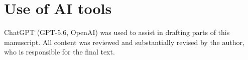 \documentclass[a4paper,12pt]{amsart}
\theoremstyle{plain}
\theoremstyle{definition}
\theoremstyle{remark}
\numberwithin{equation}{subsection}
\begin{document}
\section*{Use of AI tools}

\noindent
ChatGPT (GPT-5.6, OpenAI) was used to
assist in drafting parts of this manuscript. All content was reviewed and substantially
revised by the author, who is responsible for the final text.



\end{document}
